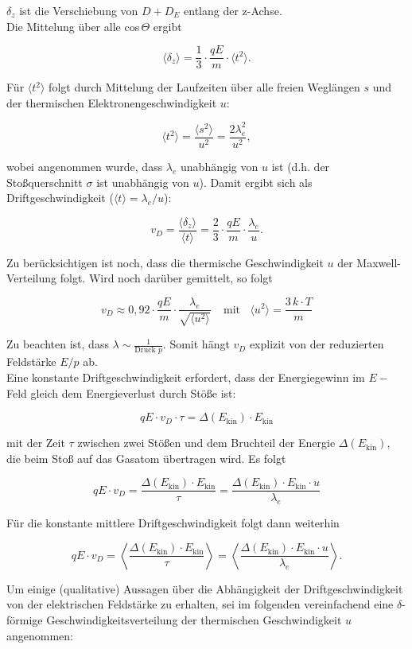 $\delta_z$ ist die Verschiebung von $D+D_E$ entlang der z-Achse.
\\
Die Mittelung über alle cos$\,\Theta$ ergibt

\[ \langle \delta_z \rangle = \frac{1}{3}\cdot \frac{qE}{m}\cdot \langle t^2 \rangle. \]

Für $\langle t^2 \rangle$ folgt durch Mittelung der Laufzeiten über alle freien Weglängen $s$
und der thermischen Elektronengeschwindigkeit $u$:

\[ \langle t^2 \rangle = \frac{\langle s^2 \rangle}{u^2} = \frac{2\lambda_e^2}{u^2} ,\]

wobei angenommen wurde, dass $\lambda_e$ unabhängig von $u$ ist (d.h. der Stoßquerschnitt $\sigma$
ist unabhängig von $u$). Damit ergibt sich als Driftgeschwindigkeit ($\langle t
\rangle=\lambda_e/u$):

\[v_D = \frac{\langle \delta_z \rangle}{\langle t\rangle} = \frac{2}{3}\cdot \frac{qE}{m}\cdot
\frac{\lambda_e}{u}.\]

Zu berücksichtigen ist noch, dass die thermische Geschwindigkeit $u$ der Maxwell-Verteilung folgt.
Wird noch darüber gemittelt, so folgt

\[v_D\approx 0{,}92\cdot \frac{qE}{m}\cdot \frac{\lambda_e}{\sqrt{\langle
u^2\rangle}}~~~~~\text{mit}~~~~ \langle u^2\rangle = \frac{3\,k\cdot T}{m}\]

Zu beachten ist, dass $\lambda\sim \frac{1}{\text{Druck }p}$. Somit hängt $v_D$ explizit von der
reduzierten Feldstärke $E/p$ ab.
\\
Eine konstante Driftgeschwindigkeit erfordert, dass der Energiegewinn im $E-$Feld gleich
dem Energieverlust durch Stöße ist:

\[qE\cdot v_D\cdot \tau = \Delta(E_\text{kin})\cdot E_\text{kin}  \]

mit der Zeit $\tau$ zwischen zwei Stößen und dem Bruchteil der Energie $\Delta(E_\text{kin})$, die
beim Stoß auf das Gasatom übertragen wird. Es folgt

\[qE\cdot v_D = \frac{\Delta(E_\text{kin})\cdot E_\text{kin}}{\tau} =
\frac{\Delta(E_\text{kin})\cdot E_\text{kin}\cdot u}{\lambda_e}  \]

Für die konstante mittlere Driftgeschwindigkeit folgt dann weiterhin

\[qE\cdot v_D = \left\langle \frac{\Delta(E_\text{kin})\cdot E_\text{kin}}{\tau} \right\rangle =
\left\langle \frac{\Delta(E_\text{kin})\cdot E_\text{kin}\cdot u}{\lambda_e}\right\rangle .\]

Um einige (qualitative) Aussagen über die Abhängigkeit der Driftgeschwindigkeit von der
elektrischen Feldstärke zu erhalten, sei im folgenden vereinfachend eine $\delta$-förmige
Geschwindigkeitsverteilung der thermischen Geschwindigkeit $u$ angenommen:

